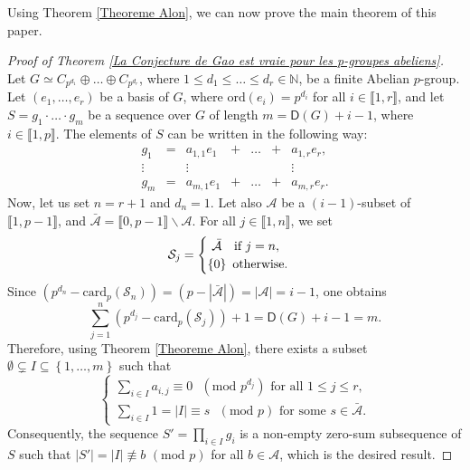 \documentclass[english,12pt,a4paper,twoside]{smfart}
\theoremstyle{plain}
\theoremstyle{definition}
\theoremstyle{remark}
\begin{document}
\medskip
Using Theorem \ref{Theoreme Alon}, we can now prove the main theorem of this paper.

\begin{proof}[Proof of Theorem \ref{La Conjecture de Gao est vraie pour les p-groupes abeliens}] 
Let $G \simeq C_{p^{d_1}} \oplus \dots \oplus C_{p^{d_r}}$, where $1 \leq d_1 \leq \dots \leq d_r \in \mathbb{N}$, be a finite Abelian $p$-group. Let $(e_1,\dots,e_r)$ be a basis of $G$, where $\text{ord}(e_i)=p^{d_i}$ for all $i \in \llbracket 1,r \rrbracket$, and let $S=g_1 \cdot \hdots \cdot g_m$ be a sequence over $G$ of length $m=\mathsf{D}(G)+i-1$, where $i \in \llbracket 1,p \rrbracket$. 
The elements of $S$ can be written in the following way:
$$\begin{array}{ccccccc}
g_1 & = & a_{1,1}e_1 & + & \dots & + & a_{1,r}e_r,\\
\vdots & & \vdots & & & &  \vdots\\
g_m & = & a_{m,1}e_1 & + & \dots & + & a_{m,r}e_r.
\end{array}$$
Now, let us set $n=r+1$ and $d_n=1$. Let also $\mathcal{A}$ be a $\left(i-1\right)$-subset of $\llbracket 1,p-1 \rrbracket$, and $\bar{\mathcal{A}}=\llbracket 0,p-1 \rrbracket \backslash \mathcal{A}$. For all $j \in \llbracket 1,n \rrbracket$, we set 
$$
\mathcal{S}_j=
\begin{cases}
\text{ } \bar{\mathcal{A}} \hspace{0.23cm} \text{ if } j=n,\\ 
\left\{0\right\} \text{ otherwise.}
\end{cases}
$$
Since $\left(p^{d_n}-\text{card}_p(\mathcal{S}_n)\right)=\left(p-\left|\bar{\mathcal{A}}\right|\right)=\left|\mathcal{A}\right|=i-1$, one obtains
$$\sum^{n}_{j=1}\left(p^{d_j}-\text{card}_p(\mathcal{S}_j)\right) + 1 = \mathsf{D}(G) + i - 1 = m.$$
Therefore, using Theorem \ref{Theoreme Alon}, there exists a subset $\emptyset \subsetneq I \subseteq \left\{1,\dots,m\right\}$ such that
$$
\begin{cases}
\displaystyle\sum_{i \in I} a_{i,j} \equiv 0 \text{ } (\text{mod } p^{d_j}) \text{ for all } 1 \leq j \leq r, \\
\displaystyle\sum_{i \in I} 1 = \left|I\right| \equiv s \text{ } (\text{mod } p) \text{ for some } s \in \bar{\mathcal{A}}.
\end{cases}
$$
Consequently, the sequence $S'=\prod_{i \in I}g_i$ is a non-empty zero-sum subsequence of $S$ such that $\left|S'\right| = \left|I\right| \not\equiv b$ $(\text{mod } p)$ for all $b \in \mathcal{A}$, which is the desired result. 
\end{proof}
\end{document}
